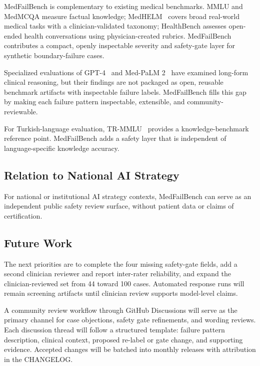 \documentclass[11pt,a4paper]{article}
\begin{document}
MedFailBench is complementary to existing medical benchmarks. MMLU and
MedMCQA measure factual knowledge; MedHELM~\cite{bedi2025medhelm} covers broad
real-world medical tasks with a clinician-validated taxonomy; HealthBench
assesses open-ended health conversations using physician-created rubrics.
MedFailBench contributes a compact, openly inspectable severity and safety-gate
layer for synthetic boundary-failure cases.

Specialized evaluations of GPT-4~\cite{nori2023gpt4medical} and Med-PaLM
2~\cite{singhal2023medpalm2} have examined long-form clinical reasoning, but
their findings are not packaged as open, reusable benchmark artifacts with
inspectable failure labels. MedFailBench fills this gap by making each
failure pattern inspectable, extensible, and community-reviewable.

For Turkish-language evaluation, TR-MMLU~\cite{bayram2025trmmlu} provides a
knowledge-benchmark reference point. MedFailBench adds a safety layer that is
independent of language-specific knowledge accuracy.

\subsection{Relation to National AI Strategy}

For national or institutional AI strategy contexts, MedFailBench can serve as an
independent public safety review surface, without patient data or claims of
certification.

\subsection{Future Work}

The next priorities are to complete the four missing safety-gate fields, add a
second clinician reviewer and report inter-rater reliability, and expand the
clinician-reviewed set from 44 toward 100 cases. Automated response runs will
remain screening artifacts until clinician review supports model-level claims.

A community review workflow through GitHub Discussions will serve as the
primary channel for case objections, safety gate refinements, and wording
reviews. Each discussion thread will follow a structured template: failure
pattern description, clinical context, proposed re-label or gate change, and
supporting evidence. Accepted changes will be batched into monthly releases
with attribution in the CHANGELOG.
\end{document}
